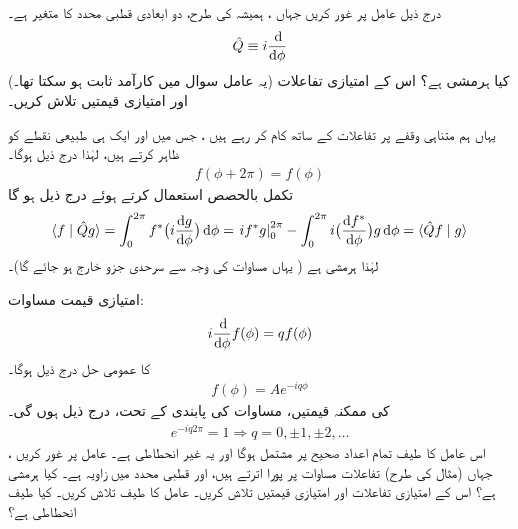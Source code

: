 درج ذیل عامل پر غور کریں جہاں ، ہمیشہ کی طرح، دو ابعادی قطبی محدد کا متغیر ہے۔
\begin{align}
	\hat{Q} \equiv i\frac{\dif}{\dif \phi}
\end{align}
(یہ عامل سوال  میں کارآمد ثابت ہو سکتا تھا۔) کیا   ہرمشی ہے؟ اس کے امتیازی تفاعلات اور امتیازی قیمتیں تلاش کریں۔

 یہاں ہم متناہی وقفے  پر تفاعلات  کے ساتھ کام کر رہے ہیں ، جس میں  اور  ایک ہی طبیعی نقطے کو ظاہر کرتے ہیں،  لہٰذا درج ذیل ہوگا۔
\begin{align}\label{مساوات_قواعد_دہراتا_تفاعل}
	f(\phi + 2\pi) = f(\phi)
\end{align}
تکمل بالحصص استعمال کرتے ہوئے  درج ذیل   ہو گا
\begin{align*}
	\langle f\mid\hat{Q}g \rangle = \int_{0}^{2\pi}f^{*}\big(i\frac{\dif g}{\dif \phi}\big)\dif \phi = \left. if^{*}g\right\vert^{2\pi}_{0} - \int_{0}^{2\pi}i\big(\frac{\dif f^*}{\dif \phi}\big)g\dif \phi = \langle \hat{Q}f\mid g \rangle
\end{align*}
لہٰذا  ہرمشی ہے ( یہاں مساوات  کی وجہ سے  سرحدی جزو خارج ہو جائے گا)۔

 امتیازی قیمت مساوات:
\begin{align}
	i\frac{\dif}{\dif \phi}f(\phi) = qf(\phi)
\end{align}
کا عمومی حل درج ذیل ہوگا۔
\begin{align}
	f(\phi) = Ae^{-iq\phi}
\end{align}
  کی ممکنہ قیمتیں،  مساوات  کی پابندی کے تحت،   درج ذیل ہوں گی۔
\begin{align}
	e^{-iq2\pi} = 1 \Rightarrow q = 0, \pm1, \pm2, \dots
\end{align}
اس عامل کا طیف تمام  اعداد   صحیح پر مشتمل ہوگا اور یہ غیر انحطاطی ہے۔
عامل  پر غور کریں ، جہاں (مثال  کی طرح) تفاعلات مساوات  پر پورا اترتے ہیں،  اور  قطبی محدد میں  زاویہ ہے۔ کیا  ہرمشی ہے؟ اس کے امتیازی تفاعلات اور امتیازی قیمتیں تلاش کریں۔ عامل  کا طیف تلاش کریں۔ کیا طیف انحطاطی ہے؟

